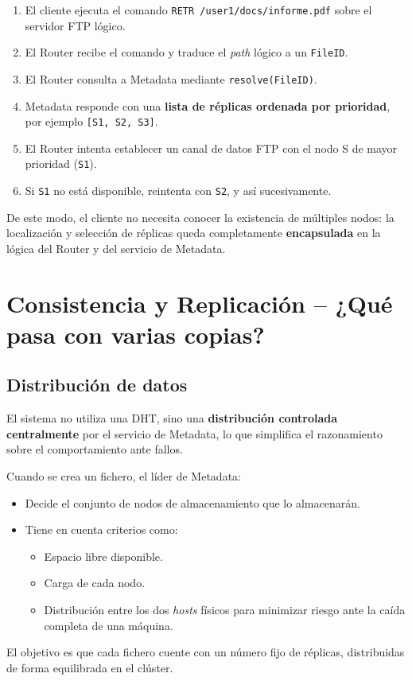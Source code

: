 \documentclass{article}
\begin{document}
\begin{enumerate}
    \item El cliente ejecuta el comando \texttt{RETR /user1/docs/informe.pdf} sobre el servidor FTP lógico.
    \item El Router recibe el comando y traduce el \emph{path} lógico a un \texttt{FileID}.
    \item El Router consulta a Metadata mediante \texttt{resolve(FileID)}.
    \item Metadata responde con una \textbf{lista de réplicas ordenada por prioridad}, por ejemplo \texttt{[S1, S2, S3]}.
    \item El Router intenta establecer un canal de datos FTP con el nodo S de mayor prioridad (\texttt{S1}).
    \item Si \texttt{S1} no está disponible, reintenta con \texttt{S2}, y así sucesivamente.
\end{enumerate}
De este modo, el cliente no necesita conocer la existencia de múltiples nodos: la localización y selección de réplicas queda completamente \textbf{encapsulada} en la lógica del Router y del servicio de Metadata.

\section{Consistencia y Replicación – ¿Qué pasa con varias copias?}

\subsection{Distribución de datos}
El sistema no utiliza una DHT, sino una \textbf{distribución controlada centralmente} por el servicio de Metadata, lo que simplifica el razonamiento sobre el comportamiento ante fallos.

Cuando se crea un fichero, el líder de Metadata:
\begin{itemize}
    \item Decide el conjunto de nodos de almacenamiento que lo almacenarán.
    \item Tiene en cuenta criterios como:
    \begin{itemize}
        \item Espacio libre disponible.
        \item Carga de cada nodo.
        \item Distribución entre los dos \emph{hosts} físicos para minimizar riesgo ante la caída completa de una máquina.
    \end{itemize}
\end{itemize}
El objetivo es que cada fichero cuente con un número fijo de réplicas, distribuidas de forma equilibrada en el clúster.
\end{document}
